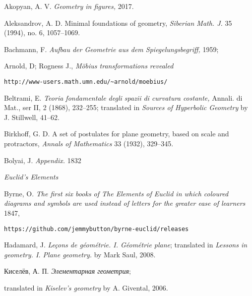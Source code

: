 \renewcommand{\bibname}{Used resources}
\begin{thebibliography}{52}

Akopyan, A. V. 
\textit{Geometry in figures,} 2017.


Aleksandrov, A. D.
Minimal foundations of geometry,
\textit{Siberian Math. J.} 35 (1994), no. 6, 1057--1069.

 Bachmann, F.
\textit{Aufbau der Geometrie aus dem Spiegelungsbegriff,} 1959;

 Arnold, D; Rogness J., \textit{M\"obius transformations revealed}
\begin{verbatim}http://www-users.math.umn.edu/~arnold/moebius/\end{verbatim}


  Beltrami, E.
\textit{Teoria fondamentale degli spazii di curvatura costante,} 
Annali. di Mat., ser II, 2 (1868), 232--255;
translated in \textit{Sources of Hyperbolic Geometry} by J. Stillwell,  41--62.

Birkhoff, G. D.
A set of postulates for plane geometry,
based on scale and protractors, 
\textit{Annals of Mathematics} 33 (1932), 329--345.

 Bolyai, J. \textit{Appendix.} 1832

\textit{Euclid's Elements}

 Byrne,  O. 
\textit{The first six books of
The Elements of Euclid
in which coloured diagrams and symbols are used
instead of letters for the greater ease of learners
} 1847,
\begin{verbatim}https://github.com/jemmybutton/byrne-euclid/releases\end{verbatim}


 Hadamard, J.
\textit{Leçons de géométrie. I. Géométrie plane}; translated in \textit{Lessons in geometry. I.
Plane geometry.} by Mark Saul, 2008.

\begin{otherlanguage}{russian}
Киселёв, А. П. 
\textit{Элементарная геометрия};
\end{otherlanguage}
translated in 
\textit{Kiselev's geometry} by A. Givental, 2006.




\end{thebibliography}

